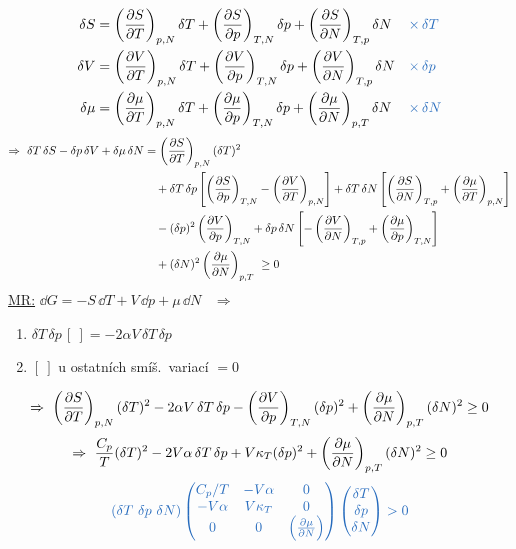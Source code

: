 \begin{priklad}
\begin{align*}
  \delta S &= \left(\pdv{S}{T}\right)_{p,N}\delta T + \left(\pdv{S}{p}\right)_{T,N}\delta p + \left(\pdv{S}{N}\right)_{T,p}\delta N && \modre{\times\,\delta T} \\
  \delta V &= \left(\pdv{V}{T}\right)_{p,N}\delta T + \left(\pdv{V}{p}\right)_{T,N}\delta p + \left(\pdv{V}{N}\right)_{T,p}\delta N && \modre{\times\,\delta p} \\
  \delta\mu &= \left(\pdv{\mu}{T}\right)_{p,N}\delta T + \left(\pdv{\mu}{p}\right)_{T,N}\delta p + \left(\pdv{\mu}{N}\right)_{p,T}\delta N && \modre{\times\,\delta N}
\end{align*}
\begin{align*}
  \Rightarrow\ \delta T\,\delta S - \delta p\,\delta V + \delta\mu\,\delta N &= \left(\pdv{S}{T}\right)_{p,N}(\delta T)^2 \\
  &\quad + \delta T\,\delta p\left[\left(\pdv{S}{p}\right)_{T,N} - \left(\pdv{V}{T}\right)_{p,N}\right]
   + \delta T\,\delta N\left[\left(\pdv{S}{N}\right)_{T,p} + \left(\pdv{\mu}{T}\right)_{p,N}\right] \\
  &\quad - (\delta p)^2\left(\pdv{V}{p}\right)_{T,N} + \delta p\,\delta N\left[-\left(\pdv{V}{N}\right)_{T,p} + \left(\pdv{\mu}{p}\right)_{T,N}\right] \\
  &\quad + (\delta N)^2\left(\pdv{\mu}{N}\right)_{p,T} \ \geq 0
\end{align*}
\underline{MR:} \quad $\dd G = -S\,\dd T + V\,\dd p + \mu\,\dd N$ \ $\Rightarrow$
\begin{enumerate}[label=\arabic*)]
  \item $\delta T\,\delta p\,[\ ] = -2\alpha V\,\delta T\,\delta p$
  \item $[\ ]$ u ostatních smíš.\ variací $= 0$
\end{enumerate}
\[
  \Rightarrow\ \left(\pdv{S}{T}\right)_{p,N}(\delta T)^2 - 2\alpha V\,\delta T\,\delta p - \left(\pdv{V}{p}\right)_{T,N}(\delta p)^2 + \left(\pdv{\mu}{N}\right)_{p,T}(\delta N)^2 \geq 0
\]
\[
  \Rightarrow\ \frac{C_p}{T}(\delta T)^2 - 2V\alpha\,\delta T\,\delta p + V\kappa_T(\delta p)^2 + \left(\pdv{\mu}{N}\right)_{p,T}(\delta N)^2 \geq 0
\]
\[
  \modre{(\delta T\ \delta p\ \delta N)
  \begin{pmatrix} C_p/T & -V\alpha & 0 \\ -V\alpha & V\kappa_T & 0 \\ 0 & 0 & \left(\frac{\partial\mu}{\partial N}\right)\end{pmatrix}
  \begin{pmatrix}\delta T\\ \delta p\\ \delta N\end{pmatrix} > 0}
\]
\end{priklad}

